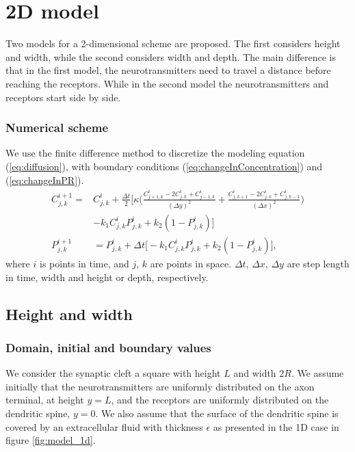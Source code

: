 \section{2D model}

Two models for a 2-dimensional scheme are proposed. The first considers height and width, while the second considers width and depth. The main difference is that in the first model, the neurotransmitters need to travel a distance before reaching the receptors. While in the second model the neurotransmitters and receptors start side by side.


\subsubsection{Numerical scheme}
We use the finite difference method to discretize the modeling equation (\ref{eq:diffusion}), with boundary conditions (\ref{eq:changeInConcentration}) and (\ref{eq:changeInPR}).
\begin{align} \label{equ:2dscheme}
C_{j,k}^{i+1}=&C_{j,k}^{i}+\frac{\Delta t}{2} \Bigg[\kappa \Big(\frac{C_{j+1,k}^{i} -2C_{j,k}^{i} + C_{j-1,k}^{i}}{(\Delta y)^2} +\frac{C_{j,k+1}^{i} -2C_{j,k}^{i} + C_{j,k-1}^{i}}{(\Delta x)^2}\Big)\nonumber\\
&-k_{1}C_{j,k}^i P_{j,k}^i+k_{2}(1-P_{j,k}^i)\Bigg]  \\
P_{j,k}^{i+1}&=P_{j,k}^i + \Delta t \Big[-k_{1}C_{j,k}^iP_{j,k}^i+k_{2}(1-P_{j,k}^i) \Big],
\end{align}  
where $i$ is points in time, and $j$, $k$ are points in space. $ \Delta t $, $ \Delta x $, $ \Delta y $ are step length in time, width and height or depth, respectively.

\subsection{Height and width}

\subsubsection{Domain, initial and boundary values} \label{2DdiffHeightwidth}
We consider the synaptic cleft a square with height $L$ and width $2R$.
We assume initially that the neurotransmitters are uniformly distributed on the axon terminal, at height $y = L$, and the receptors are uniformly distributed on the dendritic spine, $y=0$. We also assume that the surface of the dendritic spine is covered by an extracellular fluid with thickness $\epsilon$ as presented in the 1D case in figure \ref{fig:model_1d}.

